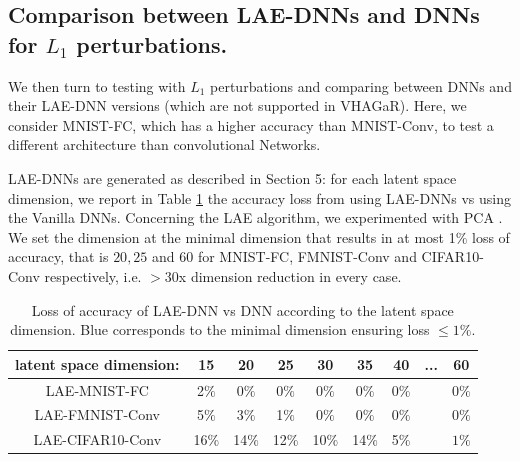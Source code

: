 \subsection{Comparison between LAE-DNNs and DNNs for $L_1$ perturbations.}
	
\label{s62}

We then turn to testing with $L_1$ perturbations and comparing between DNNs and their LAE-DNN versions (which are not supported in VHAGaR). Here, we consider MNIST-FC, which has a higher accuracy than MNIST-Conv, 
to test a different architecture than convolutional Networks.

LAE-DNNs are generated as described in Section 5: for each latent space dimension, we report in Table \ref{table.LAE} the accuracy loss from using LAE-DNNs vs using the Vanilla DNNs. 
Concerning the LAE algorithm, we experimented with PCA 
\citep{Paco}.
We set the dimension at the minimal dimension that results in at most 1$\%$ 
loss of accuracy, that is $20, 25$ and $60$ for  MNIST-FC, FMNIST-Conv and CIFAR10-Conv respectively, i.e. $>30$x dimension reduction in every case.


\begin{table}[h!]
	\centering
	\begin{tabular}{|c c c c c c c c c |}\hline
		latent space dimension: & 15 & 20 & 25 & 30 & 35 & 40 & ... & 60 
		
		\\\hline
		LAE-MNIST-FC  & 2$\%$ & {\color{blue} 0$\%$} & 0$\%$& 0$\%$ & 0$\%$& 0$\%$ & &0$\%$
		\\	
 		LAE-FMNIST-Conv & 5$\%$ &	3$\%$ &	{\color{blue} 1$\%$} & 0$\%$& 0$\%$	&0$\%$ & &	0$\%$ 
		\\
		LAE-CIFAR10-Conv  & 16$\%$ &	14$\%$ &	12$\%$ & 10$\%$ &	14$\%$ &	5$\%$ &	& {\color{blue} $1\%$}
		\\\hline
	\end{tabular}

	\caption{Loss of accuracy of LAE-DNN vs DNN according to the latent space dimension.
	{\color{blue} Blue} corresponds to the minimal dimension ensuring loss $\leq 1\%$.}
    \label{table.LAE}
\end{table}

